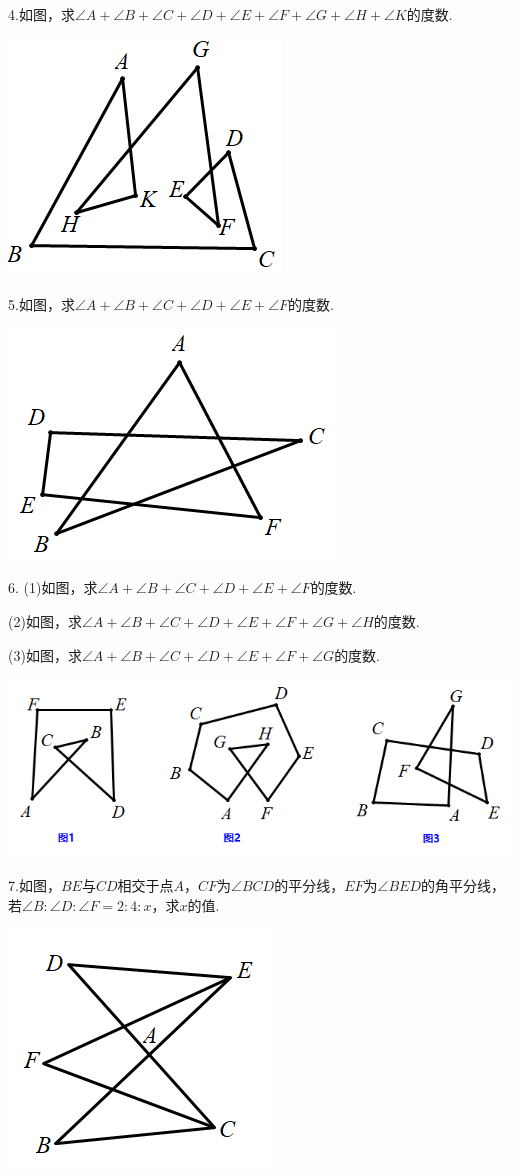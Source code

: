 \documentclass[10pt]{ctexart}
\begin{document}
\begin{shaded} 
4.如图，求$\angle A+\angle B+\angle C+\angle D+\angle E+\angle F+\angle G+\angle H+\angle K$的度数.
\end{shaded}
 \includegraphics[scale=0.5]{figure/bazhi12.PNG}
\begin{shaded} 
5.如图，求$\angle A+\angle B+\angle C+\angle D+\angle E+\angle F$的度数.
\end{shaded}
 \includegraphics[scale=0.5]{figure/bazhi15.PNG}
\begin{shaded} 
6. (1)如图，求$\angle A+\angle B+\angle C+\angle D+\angle E+\angle F$的度数.

    (2)如图，求$\angle A+\angle B+\angle C+\angle D+\angle E+\angle F+\angle G+\angle H$的度数.
    
    (3)如图，求$\angle A+\angle B+\angle C+\angle D+\angle E+\angle F+\angle G$的度数.
\end{shaded}    
 \includegraphics[scale=0.5]{figure/bazhi13.PNG}
\begin{shaded} 
7.如图，$BE$与$CD$相交于点$A$，$CF$为$\angle BCD$的平分线，$EF$为$\angle BED$的角平分线，若$\angle B:\angle D:\angle F=2:4:x$，求$x$的值.
\end{shaded}
 \includegraphics[scale=0.5]{figure/bazhi14.PNG}
\end{document}

